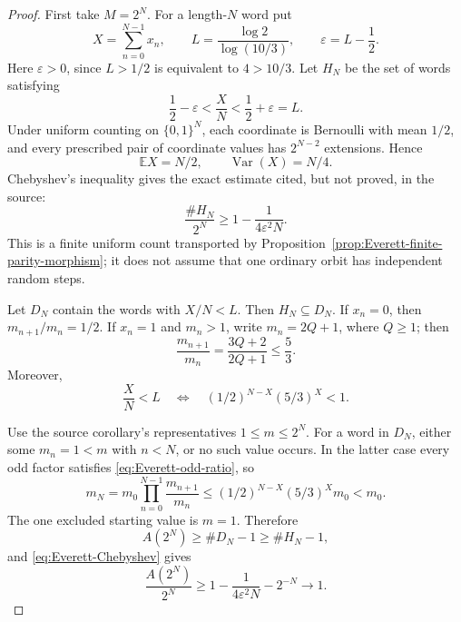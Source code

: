 \begin{proof}
First take \(M=2^N\).  For a length-\(N\) word put
\begin{equation}
\label{eq:Everett-L-epsilon}
 X=\sum_{n=0}^{N-1}x_n,
 \qquad
 L=\frac{\log2}{\log(10/3)},
 \qquad
 \varepsilon=L-\frac12.
\end{equation}
Here \(\varepsilon>0\), since \(L>1/2\) is equivalent to \(4>10/3\).
Let \(H_N\) be the set of words satisfying
\begin{equation}
\label{eq:Everett-HN}
 \frac12-\varepsilon<\frac XN<\frac12+\varepsilon=L.
\end{equation}
Under uniform counting on \(\{0,1\}^N\), each coordinate is Bernoulli with
mean \(1/2\), and every prescribed pair of coordinate values has
\(2^{N-2}\) extensions.  Hence
\[
 \mathbb E X=N/2,
 \qquad
 \operatorname{Var}(X)=N/4.
\]
Chebyshev's inequality gives the exact estimate cited, but not proved, in the
source:
\begin{equation}
\label{eq:Everett-Chebyshev}
 \frac{\#H_N}{2^N}
 \ge1-\frac1{4\varepsilon^2N}.
\end{equation}
This is a finite uniform count transported by
Proposition~\ref{prop:Everett-finite-parity-morphism}; it does not assume that
one ordinary orbit has independent random steps.

Let \(D_N\) contain the words with \(X/N<L\).  Then \(H_N\subseteq D_N\).
If \(x_n=0\), then \(m_{n+1}/m_n=1/2\).  If \(x_n=1\) and \(m_n>1\), write
\(m_n=2Q+1\), where \(Q\ge1\); then
\begin{equation}
\label{eq:Everett-odd-ratio}
 \frac{m_{n+1}}{m_n}
 =\frac{3Q+2}{2Q+1}\le\frac53.
\end{equation}
Moreover,
\begin{equation}
\label{eq:Everett-word-contraction}
 \frac XN<L
 \quad\Longleftrightarrow\quad
 (1/2)^{N-X}(5/3)^X<1.
\end{equation}

Use the source corollary's representatives \(1\le m\le2^N\).  For a word in
\(D_N\), either some \(m_n=1<m\) with \(n<N\), or no such value occurs.  In
the latter case every odd factor satisfies \eqref{eq:Everett-odd-ratio}, so
\[
 m_N=m_0\prod_{n=0}^{N-1}\frac{m_{n+1}}{m_n}
 \le(1/2)^{N-X}(5/3)^Xm_0<m_0.
\]
The one excluded starting value is \(m=1\).  Therefore
\begin{equation}
\label{eq:Everett-dyadic-count}
 A(2^N)\ge\#D_N-1\ge\#H_N-1,
\end{equation}
and \eqref{eq:Everett-Chebyshev} gives
\begin{equation}
\label{eq:Everett-dyadic-density}
 \frac{A(2^N)}{2^N}
 \ge1-\frac1{4\varepsilon^2N}-2^{-N}\longrightarrow1.
\end{equation}


\end{proof}

